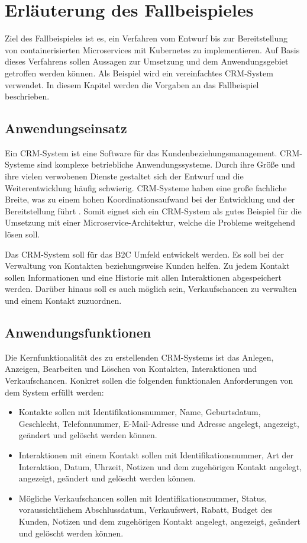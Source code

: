 \section{Erläuterung des Fallbeispieles}
Ziel des Fallbeispieles ist es, ein Verfahren vom Entwurf bis zur Bereitstellung von containerisierten Microservices mit Kubernetes zu implementieren. Auf Basis dieses Verfahrens sollen Aussagen zur Umsetzung und dem Anwendungsgebiet getroffen werden können. Als Beispiel wird ein vereinfachtes \ac{CRM}-System verwendet. In diesem Kapitel werden die Vorgaben an das Fallbeispiel beschrieben.

\subsection{Anwendungseinsatz}
Ein \ac{CRM}-System ist eine Software für das Kundenbeziehungsmanagement. \ac{CRM}-Systeme sind komplexe betriebliche Anwendungssysteme. Durch ihre Größe und ihre vielen verwobenen Dienste gestaltet sich der Entwurf und die Weiterentwicklung häufig schwierig. \ac{CRM}-Systeme haben eine große fachliche Breite, was zu einem hohen Koordinationsaufwand bei der Entwicklung und der Bereitstellung führt \parencite[vgl.][S. 62]{trempArchitekturen2021}. Somit eignet sich ein \ac{CRM}-System als gutes Beispiel für die Umsetzung mit einer Microservice-Architektur, welche die Probleme weitgehend lösen soll. 

Das \ac{CRM}-System soll für das \ac{B2C} Umfeld entwickelt werden. Es soll bei der Verwaltung von Kontakten beziehungsweise Kunden helfen. Zu jedem Kontakt sollen Informationen und eine Historie mit allen Interaktionen abgespeichert werden. Darüber hinaus soll es auch möglich sein, Verkaufschancen zu verwalten und einem Kontakt zuzuordnen.

\subsection{Anwendungsfunktionen}
Die Kernfunktionalität des zu erstellenden \ac{CRM}-Systems ist das Anlegen, Anzeigen, Bearbeiten und Löschen von Kontakten, Interaktionen und Verkaufschancen. Konkret sollen die folgenden funktionalen Anforderungen von dem System erfüllt werden:
\begin{itemize}
\item Kontakte sollen mit Identifikationsnummer, Name, Geburtsdatum, Geschlecht, Telefonnummer, E-Mail-Adresse und Adresse angelegt, angezeigt, geändert und gelöscht werden können.
\item Interaktionen mit einem Kontakt sollen mit Identifikationsnummer, Art der Interaktion, Datum, Uhrzeit, Notizen und dem zugehörigen Kontakt angelegt, angezeigt, geändert und gelöscht werden können.
\item Mögliche Verkaufschancen sollen mit Identifikationsnummer, Status, voraussichtlichem Abschlussdatum, Verkaufswert, Rabatt, Budget des Kunden, Notizen und dem zugehörigen Kontakt angelegt, angezeigt, geändert und gelöscht werden können.
\end{itemize} 

